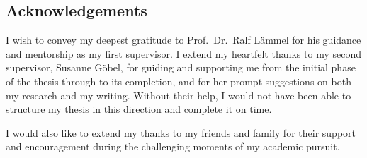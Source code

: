 
\subsection*{Acknowledgements}

I wish to convey my deepest gratitude to Prof.\ Dr.\ Ralf Lämmel for his guidance and mentorship
as my first supervisor. I extend my heartfelt thanks to my second supervisor, Susanne Göbel, for
guiding and supporting me from the initial phase of the thesis through to its completion, and for
her prompt suggestions on both my research and my writing. Without their help, I would not have
been able to structure my thesis in this direction and complete it on time.

I would also like to extend my thanks to my friends and family for their support and
encouragement during the challenging moments of my academic pursuit.
